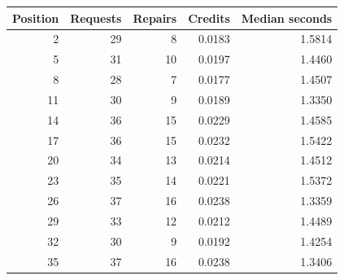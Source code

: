 \begin{tabular}{rrrrr}
\toprule
Position & Requests & Repairs & Credits & Median seconds \\
\midrule
2 & 29 & 8 & 0.0183 & 1.5814 \\
5 & 31 & 10 & 0.0197 & 1.4460 \\
8 & 28 & 7 & 0.0177 & 1.4507 \\
11 & 30 & 9 & 0.0189 & 1.3350 \\
14 & 36 & 15 & 0.0229 & 1.4585 \\
17 & 36 & 15 & 0.0232 & 1.5422 \\
20 & 34 & 13 & 0.0214 & 1.4512 \\
23 & 35 & 14 & 0.0221 & 1.5372 \\
26 & 37 & 16 & 0.0238 & 1.3359 \\
29 & 33 & 12 & 0.0212 & 1.4489 \\
32 & 30 & 9 & 0.0192 & 1.4254 \\
35 & 37 & 16 & 0.0238 & 1.3406 \\
\bottomrule
\end{tabular}
